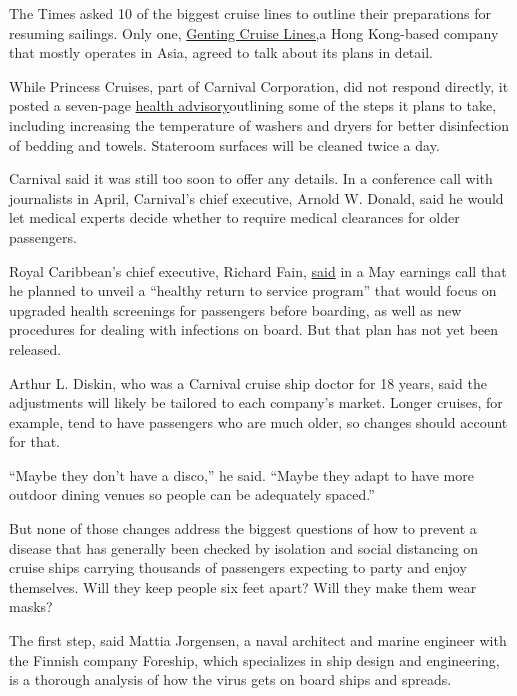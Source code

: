 The Times asked 10 of the biggest cruise lines to outline their
preparations for resuming sailings. Only one,
\href{http://gentingcruiselines.com/}{Genting Cruise Lines,}a Hong
Kong-based company that mostly operates in Asia, agreed to talk about
its plans in detail.

While Princess Cruises, part of Carnival Corporation, did not respond
directly, it posted a seven-page
\href{https://www.princess.com/downloads/pdf/plan/Health-Advisory-and-Travel-Safety-Procedures.pdf}{health
advisory}outlining some of the steps it plans to take, including
increasing the temperature of washers and dryers for better disinfection
of bedding and towels. Stateroom surfaces will be cleaned twice a day.

Carnival said it was still too soon to offer any details. In a
conference call with journalists in April, Carnival's chief executive,
Arnold W. Donald, said he would let medical experts decide whether to
require medical clearances for older passengers.

Royal Caribbean's chief executive, Richard Fain,
\href{https://www.fool.com/earnings/call-transcripts/2020/05/20/royal-caribbean-cruises-ltd-rcl-q1-2020-earnings-c.aspx}{said}
in a May earnings call that he planned to unveil a ``healthy return to
service program'' that would focus on upgraded health screenings for
passengers before boarding, as well as new procedures for dealing with
infections on board. But that plan has not yet been released.

Arthur L. Diskin, who was a Carnival cruise ship doctor for 18 years,
said the adjustments will likely be tailored to each company's market.
Longer cruises, for example, tend to have passengers who are much older,
so changes should account for that.

``Maybe they don't have a disco,'' he said. ``Maybe they adapt to have
more outdoor dining venues so people can be adequately spaced.''

But none of those changes address the biggest questions of how to
prevent a disease that has generally been checked by isolation and
social distancing on cruise ships carrying thousands of passengers
expecting to party and enjoy themselves. Will they keep people six feet
apart? Will they make them wear masks?

The first step, said Mattia Jorgensen, a naval architect and marine
engineer with the Finnish company Foreship, which specializes in ship
design and engineering, is a thorough analysis of how the virus gets on
board ships and spreads.

